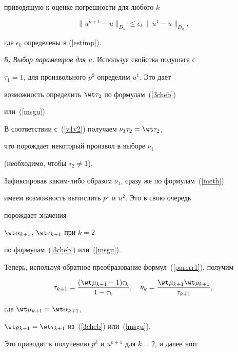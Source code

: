 приводящую к оценке погрешности для любого $k$


\begin{equation}


\label{estimu1}


\| u^{k+1} - u \|_{D_u} \leq \epsilon_k \,\| u^1 - u \|_{D_u},


\end{equation}


где $\epsilon_k$ определены в (\ref{estimp}).


\medskip





{\bf 5.} {\it Выбор параметров для $u$.} Используя свойства полушага с


$\tau_1 = 1$, для произвольного $p^0$ определим $u^1$. Это дает


возможность определить $\wt \tau_2$ по формулам~(\ref{3cheb})


или~(\ref{msgu}).


В соответствии с~(\ref{v1v2}) получаем $\nu_1 \tau_2 = \wt \tau_2$,


что порождает некоторый произвол в выборе $\nu_1$


(необходимо, чтобы $\tau_2 \neq 1$).


Зафиксировав каким-либо образом $\nu_1$, сразу же по формулам~(\ref{meth})


имеем возможность вычислить $p^1$ и $u^2$. Это в свою очередь


порождает значения


$\wt \alpha_{k+1}$, $\wt \tau_{k+1}$ при $k=2$


по формулам~(\ref{3cheb}) или~(\ref{msgu}).


Теперь, используя обратное преобразование формул~(\ref{parerr1}), получим


\begin{equation}


\label{paru}


\tau_{k+1} = \frac{(\wt \mu_{k+1} - 1) \tau_{k}}{ 1 - \tau_{k}}, \quad


\nu_{k} = \frac{\wt \mu_{k+1} \wt \rho_{k+1}}{ \tau_{k+1}},


\end{equation}


где $\wt \mu_{k+1} = \wt \alpha_{k+1}$,


$\wt \rho_{k+1} = \wt \tau_{k+1}$ из~(\ref{3cheb}) или~(\ref{msgu}).


Это приводит к получению $p^k$ и $u^{k+1}$ для $k=2$, и далее этот


